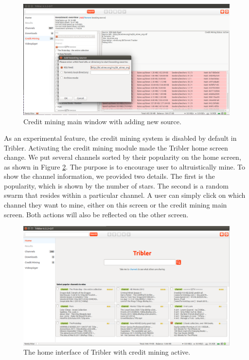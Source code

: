 \begin{figure}[h!]
	\begin{adjustwidth}{-1.5cm}{-1cm}
			\centering
			\includegraphics[width=1.2\textwidth]{pics/overview_result.png}
			\caption{Credit mining main window with adding new source.}
			\label{fig:overview}
		
	\end{adjustwidth}
\end{figure}

As an experimental feature, the credit mining system is disabled by default in Tribler. Activating the credit mining module made the Tribler home screen change. We put several channels sorted by their popularity on the home screen, as shown in Figure \ref{fig:homecm}. The purpose is to encourage user to altruistically mine. To show the channel information, we provided two details. The first is the popularity, which is shown by the number of stars. The second is a random swarm that resides within a particular channel. A user can simply click on which channel they want to mine, either on this screen or the credit mining main screen. Both actions will also be reflected on the other screen. 

\begin{figure}[h]
	\includegraphics[width=\textwidth]{pics/home_channel.png}
	\caption{The home interface of Tribler with credit mining active.}
	\label{fig:homecm}
\end{figure}

